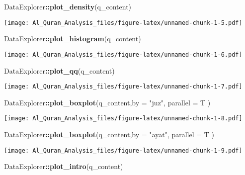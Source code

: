 \documentclass[]{article}
\newenvironment{Shaded}{\begin{snugshade}}{\end{snugshade}}
\newcommand{\DataTypeTok}[1]{\textcolor[rgb]{0.13,0.29,0.53}{#1}}
\newcommand{\KeywordTok}[1]{\textcolor[rgb]{0.13,0.29,0.53}{\textbf{#1}}}
\newcommand{\NormalTok}[1]{#1}
\newcommand{\OperatorTok}[1]{\textcolor[rgb]{0.81,0.36,0.00}{\textbf{#1}}}
\newcommand{\StringTok}[1]{\textcolor[rgb]{0.31,0.60,0.02}{#1}}
\begin{document}
\begin{Shaded}
\begin{Highlighting}[]
\NormalTok{DataExplorer}\OperatorTok{::}\KeywordTok{plot_density}\NormalTok{(q_content)}
\end{Highlighting}
\end{Shaded}

\texttt{[image: Al\_Quran\_Analysis\_files/figure-latex/unnamed-chunk-1-5.pdf]}

\begin{Shaded}
\begin{Highlighting}[]
\NormalTok{DataExplorer}\OperatorTok{::}\KeywordTok{plot_histogram}\NormalTok{(q_content)}
\end{Highlighting}
\end{Shaded}

\texttt{[image: Al\_Quran\_Analysis\_files/figure-latex/unnamed-chunk-1-6.pdf]}

\begin{Shaded}
\begin{Highlighting}[]
\NormalTok{DataExplorer}\OperatorTok{::}\KeywordTok{plot_qq}\NormalTok{(q_content)}
\end{Highlighting}
\end{Shaded}

\texttt{[image: Al\_Quran\_Analysis\_files/figure-latex/unnamed-chunk-1-7.pdf]}

\begin{Shaded}
\begin{Highlighting}[]
\NormalTok{DataExplorer}\OperatorTok{::}\KeywordTok{plot_boxplot}\NormalTok{(q_content,}\DataTypeTok{by =} \StringTok{"juz"}\NormalTok{, }\DataTypeTok{parallel =}\NormalTok{ T )}
\end{Highlighting}
\end{Shaded}

\texttt{[image: Al\_Quran\_Analysis\_files/figure-latex/unnamed-chunk-1-8.pdf]}

\begin{Shaded}
\begin{Highlighting}[]
\NormalTok{DataExplorer}\OperatorTok{::}\KeywordTok{plot_boxplot}\NormalTok{(q_content,}\DataTypeTok{by =} \StringTok{"ayat"}\NormalTok{, }\DataTypeTok{parallel =}\NormalTok{ T )}
\end{Highlighting}
\end{Shaded}

\texttt{[image: Al\_Quran\_Analysis\_files/figure-latex/unnamed-chunk-1-9.pdf]}

\begin{Shaded}
\begin{Highlighting}[]
\NormalTok{DataExplorer}\OperatorTok{::}\KeywordTok{plot_intro}\NormalTok{(q_content)}
\end{Highlighting}
\end{Shaded}
\end{document}
